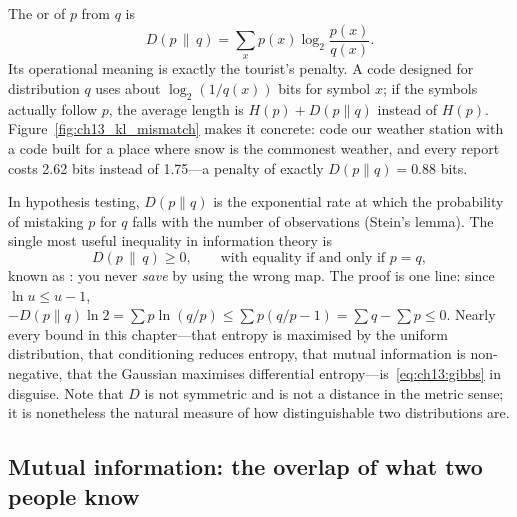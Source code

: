 The  or  of $p$ from $q$ is
\begin{equation}
D(p\,\|\,q)=\sum_xp(x)\log_2\frac{p(x)}{q(x)}.
\label{eq:ch13:kl}
\end{equation}
Its operational meaning is exactly the tourist's penalty. A code designed for distribution $q$
uses about $\log_2(1/q(x))$ bits for symbol $x$; if the symbols actually follow $p$, the average
length is $H(p)+D(p\|q)$ instead of $H(p)$. Figure~\ref{fig:ch13_kl_mismatch} makes it concrete:
code our weather station with a code built for a place where snow is the commonest weather, and
every report costs 2.62 bits instead of 1.75---a penalty of exactly $D(p\|q)=0.88$ bits.


In hypothesis testing, $D(p\|q)$ is the exponential
rate at which the probability of mistaking $p$ for $q$ falls with the number of observations
(Stein's lemma). The single most useful inequality in information theory is
\begin{equation}
D(p\,\|\,q)\ge0,\qquad\text{with equality if and only if }p=q,
\label{eq:ch13:gibbs}
\end{equation}
known as : you never \emph{save} by using the wrong map. The proof is one
line: since $\ln u\le u-1$, $-D(p\|q)\ln2=\sum p\ln(q/p)\le\sum p(q/p-1)=\sum q-\sum p\le0$.
Nearly every bound in this chapter---that entropy is maximised by the uniform distribution, that
conditioning reduces entropy, that mutual information is non-negative, that the Gaussian maximises
differential entropy---is~\eqref{eq:ch13:gibbs} in disguise. Note that $D$ is not symmetric and is
not a distance in the metric sense; it is nonetheless the natural measure of how distinguishable
two distributions are.

\subsection{Mutual information: the overlap of what two people know}

